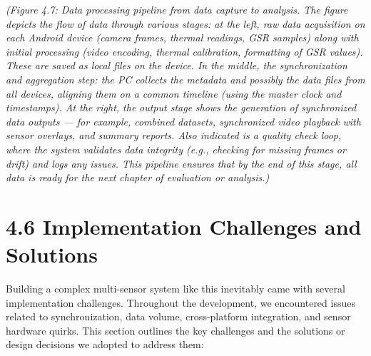 \textit{(Figure 4.7: Data processing pipeline from data capture to analysis.
The figure depicts the flow of data through various stages: at the left,
raw data acquisition on each Android device (camera frames, thermal
readings, GSR samples) along with initial processing (video encoding,
thermal calibration, formatting of GSR values). These are saved as local
files on the device. In the middle, the} \textit{synchronization and
aggregation} \textit{step: the PC collects the metadata and possibly the data
files from all devices, aligning them on a common timeline (using the
master clock and timestamps). At the right, the} \textit{output stage} \textit{shows
the generation of synchronized data outputs --- for example, combined
datasets, synchronized video playback with sensor overlays, and summary
reports. Also indicated is a quality check loop, where the system
validates data integrity (e.g., checking for missing frames or drift)
and logs any issues. This pipeline ensures that by the end of this
stage, all data is ready for the next chapter of evaluation or
analysis.)}

\section{4.6 Implementation Challenges and Solutions}

Building a complex multi-sensor system like this inevitably came with
several implementation challenges. Throughout the development, we
encountered issues related to synchronization, data volume,
cross-platform integration, and sensor hardware quirks. This section
outlines the key challenges and the solutions or design decisions we
adopted to address them:

